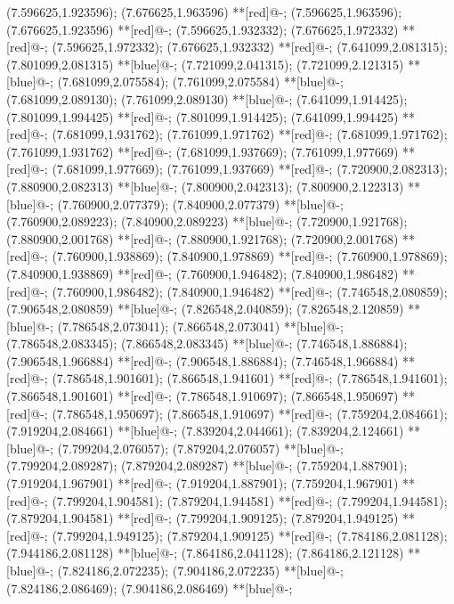 (7.596625,1.923596); (7.676625,1.963596) **[red]@{-};
(7.596625,1.963596); (7.676625,1.923596) **[red]@{-};
(7.596625,1.932332); (7.676625,1.972332) **[red]@{-};
(7.596625,1.972332); (7.676625,1.932332) **[red]@{-};
(7.641099,2.081315); (7.801099,2.081315) **[blue]@{-};
(7.721099,2.041315); (7.721099,2.121315) **[blue]@{-};
(7.681099,2.075584); (7.761099,2.075584) **[blue]@{-};
(7.681099,2.089130); (7.761099,2.089130) **[blue]@{-};
(7.641099,1.914425); (7.801099,1.994425) **[red]@{-};
(7.801099,1.914425); (7.641099,1.994425) **[red]@{-};
(7.681099,1.931762); (7.761099,1.971762) **[red]@{-};
(7.681099,1.971762); (7.761099,1.931762) **[red]@{-};
(7.681099,1.937669); (7.761099,1.977669) **[red]@{-};
(7.681099,1.977669); (7.761099,1.937669) **[red]@{-};
(7.720900,2.082313); (7.880900,2.082313) **[blue]@{-};
(7.800900,2.042313); (7.800900,2.122313) **[blue]@{-};
(7.760900,2.077379); (7.840900,2.077379) **[blue]@{-};
(7.760900,2.089223); (7.840900,2.089223) **[blue]@{-};
(7.720900,1.921768); (7.880900,2.001768) **[red]@{-};
(7.880900,1.921768); (7.720900,2.001768) **[red]@{-};
(7.760900,1.938869); (7.840900,1.978869) **[red]@{-};
(7.760900,1.978869); (7.840900,1.938869) **[red]@{-};
(7.760900,1.946482); (7.840900,1.986482) **[red]@{-};
(7.760900,1.986482); (7.840900,1.946482) **[red]@{-};
(7.746548,2.080859); (7.906548,2.080859) **[blue]@{-};
(7.826548,2.040859); (7.826548,2.120859) **[blue]@{-};
(7.786548,2.073041); (7.866548,2.073041) **[blue]@{-};
(7.786548,2.083345); (7.866548,2.083345) **[blue]@{-};
(7.746548,1.886884); (7.906548,1.966884) **[red]@{-};
(7.906548,1.886884); (7.746548,1.966884) **[red]@{-};
(7.786548,1.901601); (7.866548,1.941601) **[red]@{-};
(7.786548,1.941601); (7.866548,1.901601) **[red]@{-};
(7.786548,1.910697); (7.866548,1.950697) **[red]@{-};
(7.786548,1.950697); (7.866548,1.910697) **[red]@{-};
(7.759204,2.084661); (7.919204,2.084661) **[blue]@{-};
(7.839204,2.044661); (7.839204,2.124661) **[blue]@{-};
(7.799204,2.076057); (7.879204,2.076057) **[blue]@{-};
(7.799204,2.089287); (7.879204,2.089287) **[blue]@{-};
(7.759204,1.887901); (7.919204,1.967901) **[red]@{-};
(7.919204,1.887901); (7.759204,1.967901) **[red]@{-};
(7.799204,1.904581); (7.879204,1.944581) **[red]@{-};
(7.799204,1.944581); (7.879204,1.904581) **[red]@{-};
(7.799204,1.909125); (7.879204,1.949125) **[red]@{-};
(7.799204,1.949125); (7.879204,1.909125) **[red]@{-};
(7.784186,2.081128); (7.944186,2.081128) **[blue]@{-};
(7.864186,2.041128); (7.864186,2.121128) **[blue]@{-};
(7.824186,2.072235); (7.904186,2.072235) **[blue]@{-};
(7.824186,2.086469); (7.904186,2.086469) **[blue]@{-};
